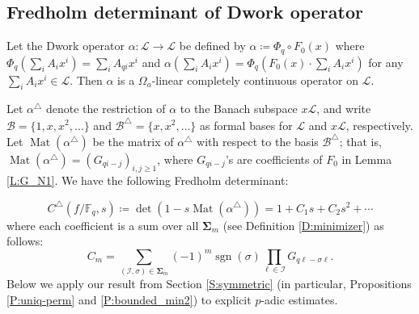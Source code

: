 \documentclass{amsart}
\numberwithin{equation}{section}
\newcommand{\F}{\mathbb{F}}
\newcommand{\cB}{\mathcal{B}}
\newcommand{\bSig}{\mathbf\Sigma}
\newcommand{\sL}{\mathscr{L}}
\newcommand{\cI}{\mathcal{I}}
\DeclareMathOperator{\Mat}{Mat}
\DeclareMathOperator{\sgn}{sgn}
\theoremstyle{plain}
\theoremstyle{definition}
\begin{document}
\subsection{Fredholm determinant of Dwork operator}\label{S:series}

Let the Dwork operator $\alpha: \sL\longrightarrow \sL$ be defined by $\alpha\coloneqq \Phi_q\circ F_0(x)$ where
$    \Phi_q \left(\sum_i A_i x^i\right) = \sum_i A_{qi}x^i$
and $\alpha(\sum_i A_i x^i)= \Phi_q(F_0(x)\cdot \sum_{i}A_i x^i)$
for any $\sum_i A_i x^i\in \sL$. Then $\alpha$ is a 
$\Omega_a$-linear completely continuous operator on $\sL$.

Let $\alpha^\triangle$ denote the restriction of $\alpha$ to the Banach subspace 
$x\sL$, and write $\cB=\{1,x,x^2,\dots\}$ and $\cB^\triangle=\{x,x^2,\dots\}$ as
formal bases for $\sL$ and $x\sL$, respectively.
Let $\Mat(\alpha^\triangle)$ be the matrix of $\alpha^\triangle$
with respect to the basis $\cB^\triangle$;
that is, $\Mat(\alpha^\triangle)=(G_{qi-j})_{i,j\ge 1}$,
where $G_{qi-j}$'s 
are coefficients of $F_0$ in Lemma \ref{L:G_N1}.
We have the following Fredholm determinant:  

\begin{equation}\label{E:C^*}
C^\triangle(f/\F_q,s)\coloneqq\det(1-s\Mat(\alpha^\triangle))=1+C_1s+C_2 s^2+\cdots
\end{equation}
where each coefficient is a sum over all $\bSig_m$
(see Definition \ref{D:minimizer}) as follows:
\begin{equation}
\label{E:C_m} 
C_m=\sum_{(\cI,\sigma)\in \bSig_m}(-1)^m\sgn(\sigma)\prod_{\ell\in \cI}G_{q\ell-\sigma\ell}.   
\end{equation}
Below we apply our result from Section \ref{S:symmetric} (in particular, Propositions \ref{P:uniq-perm}
and \ref{P:bounded_min2}) to explicit $p$-adic estimates.
\end{document}
